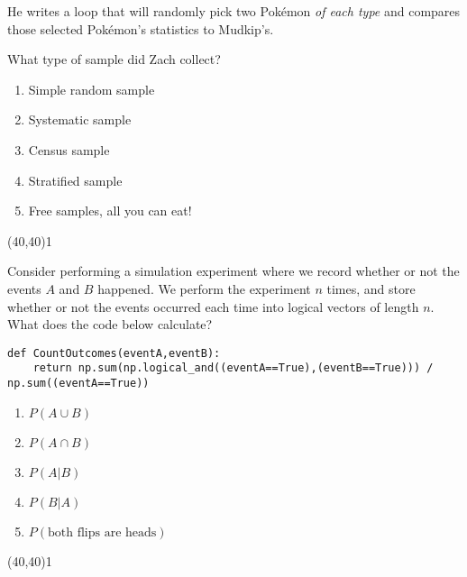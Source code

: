 \documentclass[addpoints]{exam}
\def\solutions{0}
\begin{document}
{\begin{questions}
He writes a loop that will randomly pick two Pok\'emon \textit{of each type} and compares those selected Pok\'emon's statistics to Mudkip's.

What type of sample did Zach collect?
\vspace{2mm}

\begin{minipage}[b]{.85\textwidth}
	\begin{enumerate}[label=\Alph*.]
		\item Simple random sample
		\item Systematic sample
		\item Census sample
		\item Stratified sample
		\item Free samples, all you can eat!
	\end{enumerate}
\end{minipage}
\begin{minipage}[b]{.1\textwidth}
	\vspace{\fill}\framebox(40,40){\if\solutions1 \fi}
\end{minipage}

\question[3]  Consider performing a simulation experiment where we record whether or not the events $A$ and $B$ happened.  We perform the experiment $n$ times, and store whether or not the events occurred each time into logical vectors of length $n$.  What does the code below calculate?

\begin{lstlisting}
def CountOutcomes(eventA,eventB):
	return np.sum(np.logical_and((eventA==True),(eventB==True))) / np.sum((eventA==True))
\end{lstlisting}

\begin{minipage}[b]{.85\textwidth}
	\begin{enumerate}[label=\Alph*.]
		\item $P(A \cup B)$
		\item $P(A \cap B)$
		\item $P(A|B)$
		\item $P(B|A)$
		\item $P(\text{both flips are heads})$
	\end{enumerate}
\end{minipage}
\begin{minipage}[b]{.1\textwidth}
	\vspace{\fill}\framebox(40,40){\if\solutions1 \fi}
\end{minipage}


\end{questions}}
\end{document}
